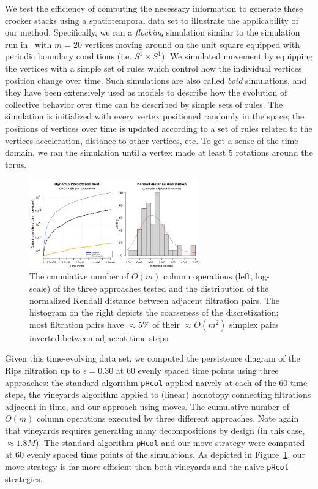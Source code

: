 \documentclass{siamart190516}
\begin{document}
We test the efficiency of computing the necessary information to generate these crocker stacks using a spatiotemporal data set to illustrate the applicability of our method. Specifically, we ran a \emph{flocking} simulation similar to the simulation run in~\cite{topaz2015topological} with $m = 20$ vertices moving around on the unit square equipped with periodic boundary conditions (i.e. $S^1 \times S^1$). We simulated movement by equipping the vertices with a simple set of rules which control how the individual vertices position change over time. Such simulations are also called \emph{boid} simulations, and they have been extensively used as models to describe how the evolution of collective behavior over time can be described by simple sets of rules.
The simulation is initialized with every vertex positioned randomly in the space; the positions of vertices over time is updated according to a set of rules related to the vertices acceleration, distance to other vertices, etc. To get a sense of the time domain, we ran the simulation until a vertex made at least 5 rotations around the torus. 
\begin{figure}[ht]
	\centering
	\includegraphics[width=0.65\textwidth]{boid_sim_results.png}
	\caption{ The cumulative number of $O(m)$ column operations (left, log-scale) of the three approaches tested and the distribution of the normalized Kendall distance between adjacent filtration pairs. The histogram on the right depicts the coarseness of the discretization; most filtration pairs have $\approx 5\%$ of their $\approx O(m^2)$ simplex pairs inverted between adjacent time steps.}\label{fig:boid_sim_results}
\end{figure}

Given this time-evolving data set, we computed the persistence diagram of the Rips filtration up to $\epsilon = 0.30$ at 60 evenly spaced time points using three approaches: the standard algorithm \texttt{pHcol} applied naïvely at each of the 60 time steps, the vineyards algorithm applied to (linear) homotopy connecting filtrations adjacent in time, and our approach using moves.   
The cumulative number of $O(m)$ column operations executed by three different approaches. Note again that vineyards requires generating many decompositions by design (in this case, $\approx 1.8M$). The standard algorithm \texttt{pHcol} and our move strategy were computed at 60 evenly spaced time points of the simulations. As depicted in Figure~\ref{fig:boid_sim_results}, our move strategy is far more efficient then both vineyards and the naive \texttt{pHcol} strategies. 
\end{document}
